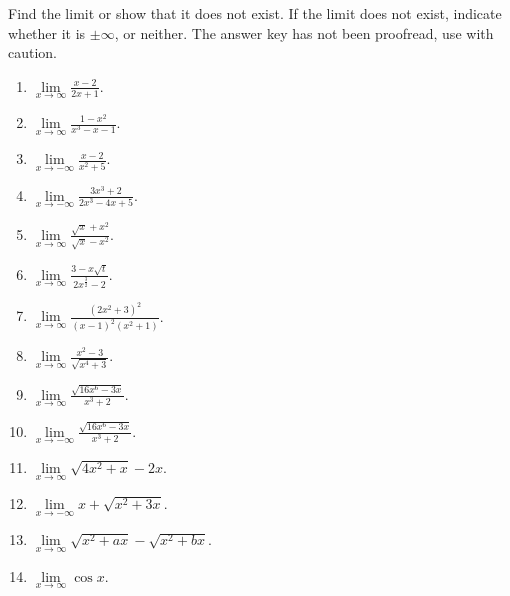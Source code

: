 Find the limit or show that it does not exist. If the limit does not exist, indicate whether it is $\pm\infty$, or neither. The answer key has not been proofread, use with caution.
\begin{multicols}{3}
\begin{enumerate}
\item $\displaystyle \lim\limits_{x\to\infty }\frac{x-2}{2x+1}$.

\item $\displaystyle \lim\limits_{x\to\infty }\frac{1-x^2}{x^3-x-1}$.

\item $\displaystyle \lim\limits_{x\to-\infty }\frac{x-2}{x^2+5}$.

\item $\displaystyle \lim\limits_{x\to-\infty }\frac{3x^3+2}{2x^3-4x+5}$.

\item $\displaystyle \lim\limits_{x\to\infty }\frac{\sqrt{x}+x^2}{\sqrt{x}-x^2}$.

\item $\displaystyle \lim\limits_{x\to\infty }\frac{3-x\sqrt{t}}{2x^{\frac{3}{2}}-2}$.

\item $\displaystyle \lim\limits_{x\to\infty }\frac{(2x^2+3)^2}{(x-1)^2(x^2+1)}$.

\item $\displaystyle \lim\limits_{x\to\infty }\frac{x^2-3}{\sqrt{x^4+3}}$.

\item $\displaystyle \lim\limits_{x\to\infty }\frac{\sqrt{16x^6-3x}}{x^3+2}$.

\item $\displaystyle \lim\limits_{x\to-\infty }\frac{\sqrt{16x^6-3x}}{x^3+2}$.

\item $\displaystyle \lim\limits_{x\to\infty}\sqrt{4x^2+x}-2x$.

\item $\displaystyle \lim\limits_{x\to-\infty} x+\sqrt{x^2+3x} $.

\item $\displaystyle \lim\limits_{x\to\infty}\sqrt{x^2+ax}-\sqrt{x^2+bx}$.

\item $\displaystyle \lim\limits_{x\to\infty}\cos x$.


\end{enumerate}
\end{multicols}

